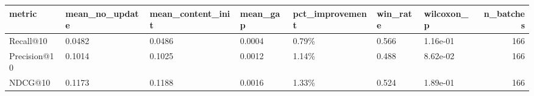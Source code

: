 \begin{tabular}{lllllllr}
\toprule
metric & mean_no_update & mean_content_init & mean_gap & pct_improvement & win_rate & wilcoxon_p & n_batches \\
\midrule
Recall@10 & 0.0482 & 0.0486 & 0.0004 & 0.79\% & 0.566 & 1.16e-01 & 166 \\
Precision@10 & 0.1014 & 0.1025 & 0.0012 & 1.14\% & 0.488 & 8.62e-02 & 166 \\
NDCG@10 & 0.1173 & 0.1188 & 0.0016 & 1.33\% & 0.524 & 1.89e-01 & 166 \\
\bottomrule
\end{tabular}
